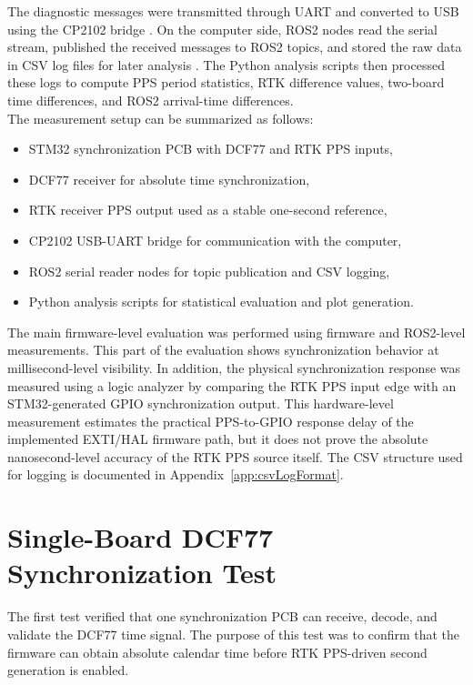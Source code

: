 The diagnostic messages were transmitted through UART and converted to USB using the CP2102 bridge \cite{cp2102Datasheet}. On the computer side, ROS2 nodes read the serial stream, published the received messages to ROS2 topics, and stored the raw data in CSV log files for later analysis \cite{ros2Docs}. The Python analysis scripts then processed these logs to compute PPS period statistics, RTK difference values, two-board time differences, and ROS2 arrival-time differences.
\\
The measurement setup can be summarized as follows:
\begin{itemize}
    \item STM32 synchronization PCB with DCF77 and RTK PPS inputs,
    \item DCF77 receiver for absolute time synchronization,
    \item RTK receiver PPS output used as a stable one-second reference,
    \item CP2102 USB-UART bridge for communication with the computer,
    \item ROS2 serial reader nodes for topic publication and CSV logging,
    \item Python analysis scripts for statistical evaluation and plot generation.
\end{itemize}

The main firmware-level evaluation was performed using firmware and ROS2-level measurements. This part of the evaluation shows synchronization behavior at millisecond-level visibility. In addition, the physical synchronization response was measured using a logic analyzer by comparing the RTK PPS input edge with an STM32-generated GPIO synchronization output. This hardware-level measurement estimates the practical PPS-to-GPIO response delay of the implemented EXTI/HAL firmware path, but it does not prove the absolute nanosecond-level accuracy of the RTK PPS source itself. The CSV structure used for logging is documented in Appendix~\ref{app:csvLogFormat}.

\section{Single-Board DCF77 Synchronization Test}

The first test verified that one synchronization PCB can receive, decode, and validate the DCF77 time signal. The purpose of this test was to confirm that the firmware can obtain absolute calendar time before RTK PPS-driven second generation is enabled.

